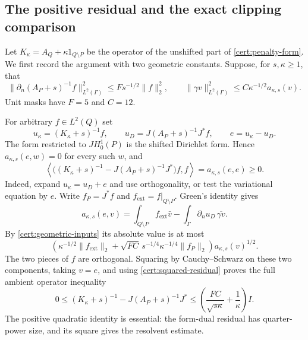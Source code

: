 \documentclass[11pt,reqno]{amsart}
\numberwithin{equation}{section}
\newcommand{\norm}[1]{\lVert#1\rVert}
\begin{document}
\subsection{The positive residual and the exact clipping comparison}
\label{cert:transfer}

Let $K_\kappa=A_Q+\kappa 1_{Q\setminus P}$ be the operator of
the unshifted part of \eqref{cert:penalty-form}.  We first record
the argument with two geometric constants.  Suppose, for
$s,\kappa\ge1$, that
\begin{equation}\label{cert:geometric-inputs}
 \norm{\partial_n(A_P+s)^{-1}f}_{L^2(\Gamma)}^2
       \le F s^{-1/2}\norm f_2^2,\qquad
 \norm{\gamma v}_{L^2(\Gamma)}^2
       \le C\kappa^{-1/2}a_{\kappa,s}(v).
\end{equation}
Unit masks have $F=5$ and $C=12$.

For arbitrary $f\in L^2(Q)$ set
\[
 u_\kappa=(K_\kappa+s)^{-1}f,\qquad
 u_D=J(A_P+s)^{-1}J^*f,\qquad e=u_\kappa-u_D.
\]
The form restricted to $JH^1_0(P)$ is the shifted Dirichlet
form.  Hence $a_{\kappa,s}(e,w)=0$ for every such $w$, and
\begin{equation}\label{cert:squared-residual}
 \left\langle\bigl((K_\kappa+s)^{-1}
              -J(A_P+s)^{-1}J^*\bigr)f,f\right\rangle
 =a_{\kappa,s}(e,e)\ge0 .
\end{equation}
Indeed, expand $u_\kappa=u_D+e$ and use orthogonality, or test
the variational equation by $e$.
Write $f_P=J^*f$ and $f_{\mathrm{ext}}=f|_{Q\setminus P}$.
Green's identity gives
\[
 a_{\kappa,s}(e,v)
 =\int_{Q\setminus P}f_{\mathrm{ext}}\bar v
       -\int_\Gamma\partial_nu_D\,\overline{\gamma v}.
\]
By \eqref{cert:geometric-inputs} its absolute value is at most
\[
 \left(\kappa^{-1/2}\norm{f_{\mathrm{ext}}}_2+
       \sqrt{FC}\,s^{-1/4}\kappa^{-1/4}\norm{f_P}_2\right)
                         a_{\kappa,s}(v)^{1/2}.
\]
The two pieces of $f$ are orthogonal.  Squaring by
Cauchy--Schwarz on these two components, taking $v=e$, and
using \eqref{cert:squared-residual} proves the full ambient
operator inequality
\begin{equation}\label{cert:penalty-resolvent}
 0\le (K_\kappa+s)^{-1}-J(A_P+s)^{-1}J^*
 \le\left(\frac{FC}{\sqrt{s\kappa}}+\frac1\kappa\right)I.
\end{equation}
The positive quadratic identity is essential: the form-dual
residual has quarter-power size, and its square gives the
resolvent estimate.
\end{document}
